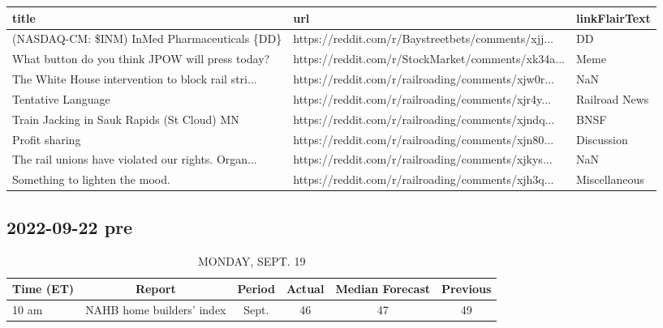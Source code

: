 \documentclass{book}
\begin{document}
  
  \begin{table}[htbp]%
  \centering%
  \begin{adjustbox}{width=1\textwidth}%
  \begin{tabular}{lll}
  \toprule
                                               title &                                                url & linkFlairText \\
  \midrule
        (NASDAQ-CM: \$INM) InMed Pharmaceuticals \{DD\} & https://reddit.com/r/Baystreetbets/comments/xjj... &            DD \\
     What button do you think JPOW will press today? & https://reddit.com/r/StockMarket/comments/xk34a... &          Meme \\
  The White House intervention to block rail stri... & https://reddit.com/r/railroading/comments/xjw0r... &           NaN \\
                                  Tentative Language & https://reddit.com/r/railroading/comments/xjr4y... & Railroad News \\
          Train Jacking in Sauk Rapids (St Cloud) MN & https://reddit.com/r/railroading/comments/xjndq... &          BNSF \\
                                      Profit sharing & https://reddit.com/r/railroading/comments/xjn80... &    Discussion \\
  The rail unions have violated our rights. Organ... & https://reddit.com/r/railroading/comments/xjkys... &           NaN \\
                      Something to lighten the mood. & https://reddit.com/r/railroading/comments/xjh3q... & Miscellaneous \\
  \bottomrule
  \end{tabular}
  \end{adjustbox}%
  \end{table}
  
  
  

  \subsection{ 2022-09-22 pre }
  \normalsize%
  
  
  \begin{table}[htbp]%
  \caption{MONDAY, SEPT. 19}%
  \centering%
  \begin{adjustbox}{width=1\textwidth}%
  \begin{tabular}{lccccc}
  \toprule
  Time (ET) &                    Report & Period & Actual & Median Forecast & Previous \\
  \midrule
      10 am & NAHB home builders' index &  Sept. &     46 &              47 &       49 \\
  \bottomrule
  \end{tabular}
  \end{adjustbox}%
  \end{table}
  
\end{document}
